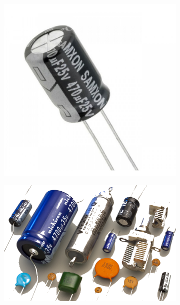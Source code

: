 \documentclass[12pt]{article}
\begin{document}
\begin{figure}[h!]
  \begin{subfigure}[b]{0.3\linewidth}
    \includegraphics[width=\linewidth]{data/condensatore-elettrolitico-valvola.jpg}
  \end{subfigure}
  \begin{subfigure}[b]{0.3\linewidth}
    \includegraphics[width=\linewidth]{data/capacitors-types.png}
  \end{subfigure}
\end{figure}
\end{document}
